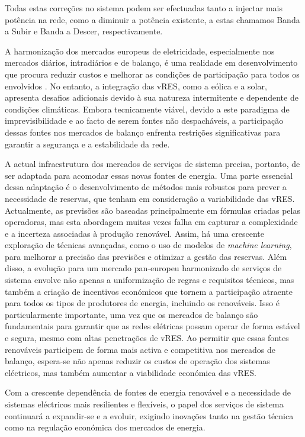 Todas estas correções no sistema podem ser efectuadas tanto a injectar mais potência na rede, como a diminuir a potência existente, a estas chamamos Banda a Subir e Banda a Descer, respectivamente.\par
A harmonização dos mercados europeus de eletricidade, especialmente nos mercados diários, intradiários e de balanço, é uma realidade em desenvolvimento que procura reduzir custos e melhorar as condições de participação para todos os envolvidos \cite{Algarvio2019}. No entanto, a integração das \gls{vRES}, como a eólica e a solar, apresenta desafios adicionais devido à sua natureza intermitente e dependente de condições climáticas. Embora tecnicamente viável, devido a este paradigma de imprevisibilidade e ao facto de serem fontes não despacháveis, a participação dessas fontes nos mercados de balanço enfrenta restrições significativas para garantir a segurança e a estabilidade da rede.\par
A actual infraestrutura dos mercados de serviços de sistema precisa, portanto, de ser adaptada para acomodar essas novas fontes de energia. Uma parte essencial dessa adaptação é o desenvolvimento de métodos mais robustos para prever a necessidade de reservas, que tenham em consideração a variabilidade das \gls{vRES}. Actualmente, as previsões são baseadas principalmente em fórmulas criadas pelas operadoras, mas esta abordagem muitas vezes falha em capturar a complexidade e a incerteza associadas à produção renovável. Assim, há uma crescente exploração de técnicas avançadas, como o uso de modelos de \textit{machine learning}, para melhorar a precisão das previsões e otimizar a gestão das reservas.
Além disso, a evolução para um mercado pan-europeu harmonizado de serviços de sistema envolve não apenas a uniformização de regras e requisitos técnicos, mas também a criação de incentivos económicos que tornem a participação atraente para todos os tipos de produtores de energia, incluindo os renováveis. Isso é particularmente importante, uma vez que os mercados de balanço são fundamentais para garantir que as redes elétricas possam operar de forma estável e segura, mesmo com altas penetrações de \gls{vRES}. Ao permitir que essas fontes renováveis participem de forma mais activa e competitiva nos mercados de balanço, espera-se não apenas reduzir os custos de operação dos sistemas eléctricos, mas também aumentar a viabilidade económica das \gls{vRES}.\par
Com a crescente dependência de fontes de energia renovável e a necessidade de sistemas eléctricos mais resilientes e flexíveis, o papel dos serviços de sistema continuará a expandir-se e a evoluir, exigindo inovações tanto na gestão técnica como na regulação económica dos mercados de energia.\par


